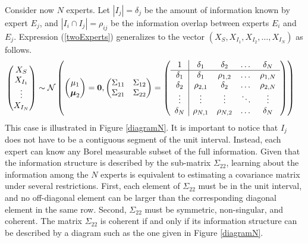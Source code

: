 \documentclass[11pt]{article}
\theoremstyle{definition}
\theoremstyle{definition}
\begin{document}
Consider now $N$ experts. Let $|I_j| = \delta_j$ be the amount of information known by expert $E_j$, and $|I_i \cap I_j| = \rho_{ij}$ be the information overlap between experts $E_i$ and $E_j$. Expression (\ref{twoExperts}) generalizes to the vector $(X_{S}, X_{I_1}, X_{I_2}, \dots, X_{I_N})$ as follows.
\begin{align}
\left(\begin{matrix} X_S \\ X_{I_1}\\ \vdots \\ X_{I_N} \end{matrix}\right) &\sim \mathcal{N}\left( \left(\begin{matrix} 
\mu_1 \\ \boldsymbol{\mu}_2
 \end{matrix}\right) =
 \boldsymbol{0}, \left(\begin{matrix} 
\Sigma_{11} & \Sigma_{12}\\
\Sigma_{21} & \Sigma_{22}\\
 \end{matrix}\right) 
 =
 \left(\begin{array}{c | c c cc }
1 & \delta_1 & \delta_2 & \dots & \delta_N  \\ \hline
\delta_1 & \delta_1 &\rho_{1,2} & \dots & \rho_{1,N}   \\ 
\delta_2 & \rho_{2,1} & \delta_2 & \dots & \rho_{2,N}  \\ 
\vdots & \vdots & \vdots & \ddots & \vdots  \\ 
\delta_N & \rho_{N,1} & \rho_{N,2} & \dots & \delta_N\\ 
 \end{array}\right)\right)  \label{NExperts}
\end{align}
This case is illustrated in Figure \ref{diagramN}. It is important to notice that $I_j$ does not have to be a contiguous segment of the unit interval. Instead, each expert can know any Borel measurable subset of the full information. Given that the information structure is described by the sub-matrix $\Sigma_{22}$, learning about the information among the $N$ experts is equivalent to estimating a covariance matrix under several restrictions. First, each element of $\Sigma_{22}$ must be in the unit interval, and no off-diagonal element can be larger than the corresponding diagonal element in the same row. Second, $\Sigma_{22}$ must be symmetric, non-singular, and coherent. The matrix $\Sigma_{22}$ is coherent if and only if its information structure can be described by a diagram such as the one given in Figure \ref{diagramN}. 
\end{document}
